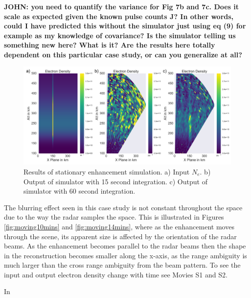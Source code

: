 \documentclass[draft,ras]{agutex}
\begin{document}
\begin{article}
{\bf JOHN: you need to quantify the variance for Fig 7b and 7c.  Does it scale as expected given the known pulse counts J?  In other words, could I have predicted this without the simulator just using eq (9) for example as my knowledge of covariance?  Is the simulator telling us something new here?  What is it?  Are the results here totally dependent on this particular case study, or can you generalize at all?}

\begin{figure}[!t]
\centering
\includegraphics[width=6in]{stationary}
\caption{Results of stationary enhancement simulation. a) Input $N_e$. b) Output of simulator with 15 second integration. c) Output of simulator with 60 second integration.}
\label{fig:stationaryall}
\end{figure}

The blurring effect seen in this case study is not constant throughout the space due to the way the radar samples the space. This is illustrated in Figures \ref{fig:moving10mins} and \ref{fig:moving14mins}, where as the enhancement moves through the scene, its apparent size is affected by the orientation of the radar beams. As the enhancement becomes parallel to the radar beams then the shape in the reconstruction becomes smaller along the x-axis, as the range ambiguity is much larger than the cross range ambiguity from the beam pattern. To see the input and output electron density change with time see Movies S1 and S2.

In


\end{article}
\end{document}
